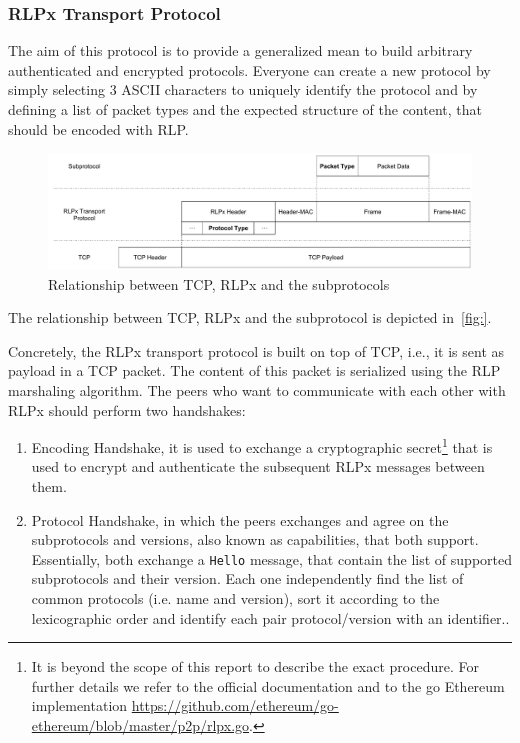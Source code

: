 \subsubsection{RLPx Transport Protocol}
\label{sec:rlpx-transport-protocol}

The aim of this protocol is to provide a generalized mean to build arbitrary
authenticated and encrypted protocols. Everyone can create a new protocol by 
simply selecting $3$ ASCII characters to uniquely identify the protocol and by
defining a list of packet types and the expected structure of the content, that 
should be encoded with RLP.

\begin{figure}
    \begin{center}
        \includegraphics[width=\textwidth]{./res/img/rlpx-transport}
        \caption{Relationship between TCP, RLPx and the subprotocols}
    \end{center}
\end{figure}

The relationship between TCP, RLPx and the subprotocol is depicted 
in~\autoref{fig:}.

Concretely, the RLPx transport protocol is built on top of TCP, i.e., it is
sent as payload in a TCP packet. The content of this packet is serialized using 
the RLP marshaling algorithm. The peers who want to communicate with each other 
with RLPx should perform two handshakes:
\begin{enumerate}
    \item Encoding Handshake, it is used to exchange a cryptographic 
    secret\footnote{It is beyond the scope of this report to describe the exact 
    procedure. For further details we refer to the official documentation 
    \cite{rlpx} and to the go Ethereum implementation 
    \url{https://github.com/ethereum/go-ethereum/blob/master/p2p/rlpx.go}.}
    that is used to encrypt and authenticate the subsequent RLPx messages 
    between them.
    \item Protocol Handshake, in which the peers exchanges and agree on the 
    subprotocols and versions, also known as capabilities, that both support.
    Essentially, both exchange a \texttt{Hello} message, that contain
    the list of supported subprotocols and their version. Each one independently
    find the list of common protocols (i.e. name and version), sort it 
    according to the lexicographic order and identify each pair protocol/version
    with an identifier..
\end{enumerate}

